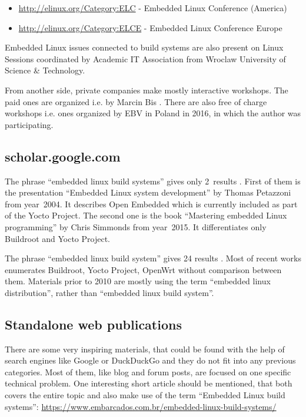\documentclass[printmode]{mgr}
\begin{document}
\begin{itemize}
  \item \url{http://elinux.org/Category:ELC} - Embedded Linux Conference (America)
  \item \url{http://elinux.org/Category:ELCE} - Embedded Linux Conference Europe
\end{itemize}

Embedded Linux issues connected to build systems are also present on Linux Sessions \cite{web:sesja-linuksowa} coordinated by Academic IT Association from Wroclaw University of Science \& Technology.

From another side, private companies make mostly interactive workshops. The paid ones are organized i.e. by Marcin Bis \cite{web:bis-szkolenia}. There are also free of charge workshops i.e. ones organized by EBV in Poland in 2016, in which the author was participating.

\subsection*{scholar.google.com}
The phrase ``embedded linux build systems'' gives only 2~results  \cite{web:scholar-1}. First of them is the presentation ``Embedded Linux system development'' by Thomas Petazzoni from year~2004. It describes Open Embedded which is currently included as part of the Yocto Project. The second one is the book ``Mastering embedded Linux programming'' by Chris Simmonds from year~2015. It differentiates only Buildroot and Yocto Project.

The phrase ``embedded linux build system'' gives 24 results \cite{web:scholar-2}. Most of recent works enumerates Buildroot, Yocto Project, OpenWrt without comparison between them. Materials prior to 2010 are mostly using the term ``embedded linux distribution'', rather than ``embedded linux build system''.

\subsection*{Standalone web publications}

There are some very inspiring materials, that could be found with the help of search engines like Google or DuckDuckGo and they do not fit into any previous categories.
Most of them, like blog and forum posts, are focused on one specific technical problem.
One interesting short article should be mentioned, that both covers the entire topic and also make use of the term ``Embedded Linux build systems'': \url{https://www.embarcados.com.br/embedded-linux-build-systems/}
\end{document}
